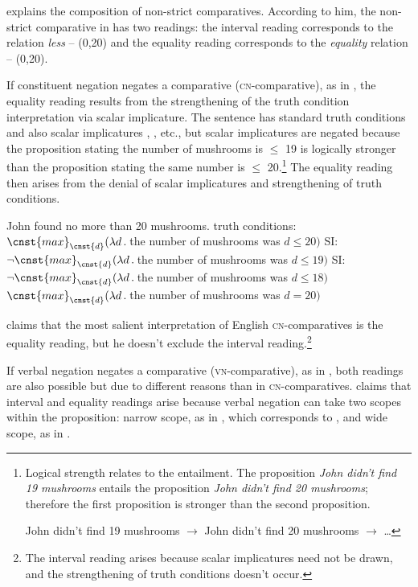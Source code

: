 \documentclass[output=paper,
]{langscibook}
\begin{document}
\cite{nouwen2008upper} explains the composition of non-strict comparatives. According to him, the non-strict comparative in  has two readings: the interval reading corresponds to the relation \textit{less} -- (0,20) and the equality reading corresponds to the \textit{equality} relation -- (0,20).

If constituent negation negates a comparative (\textsc{cn-}comparative), as in , the equality reading results from the strengthening of the truth condition interpretation via scalar implicature. The sentence has standard truth conditions  and also scalar implicatures , , etc., but scalar implicatures are negated because the proposition stating the number of mushrooms is $\leq$ 19 is logically stronger than the proposition stating the same number is $\leq$ 20.\footnote{Logical strength relates to the entailment. The proposition \textit{John didn't find 19 mushrooms} entails the proposition \textit{John didn't find 20 mushrooms}; therefore the first proposition is stronger than the second proposition.

\ea John didn't find 19 mushrooms $\rightarrow$ John didn't find 20 mushrooms $\rightarrow$ \dots
\z } The equality reading then arises from the denial of scalar implicatures and strengthening of truth conditions.

\ea \label{ex:sen} John found no more than 20 mushrooms.
        \ea truth conditions: $\cnst{max}_{\cnst{d}}(\lambda d\,.\,$the number of mushrooms was $d\leq 20)$ \label{ex:tc_1}
		\ex SI: $\neg\cnst{max}_{\cnst{d}}(\lambda d\,.\,$the number of mushrooms was $d\leq 19)$ \label{ex:si_1}
		\ex SI: $\neg\cnst{max}_{\cnst{d}}(\lambda d\,.\,$the number of mushrooms was $d\leq 18)$ \label{ex:si_1_2}
\ex $\cnst{max}_{\cnst{d}}(\lambda d\,.\,$the number of mushrooms was $d=20)$ 
\z
\z


\noindent \cite{nouwen2008upper} claims that the most salient interpretation of English \textsc{cn-}comparatives is the equality reading, but he doesn't exclude the interval reading.\footnote{The interval reading arises because scalar implicatures need not be drawn, and the strengthening of truth conditions doesn't occur.} 

If verbal negation negates a comparative (\textsc{vn-}comparative), as in , both readings are also possible but due to different reasons than in \textsc{cn-}comparatives. \cite{nouwen2008upper} claims that interval and equality readings arise because verbal negation can take two scopes within the proposition: narrow scope, as in , which corresponds to , and wide scope, as in .
\end{document}
